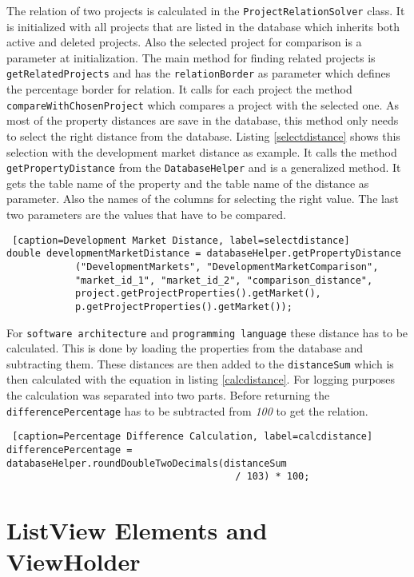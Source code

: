 The relation of two projects is calculated in the \texttt{ProjectRelationSolver} class. It is initialized with all projects that are listed in the database which inherits both active and deleted projects. Also the selected project for comparison is a parameter at initialization. The main method for finding related projects is \texttt{getRelatedProjects} and has the \texttt{relationBorder} as parameter which defines the percentage border for relation. It calls for each project the method \texttt{compareWithChosenProject} which compares a project with the selected one. As most of the property distances are save in the database, this method only needs to select the right distance from the database. Listing \ref{selectdistance} shows this selection with the development market distance as example. It calls the method \texttt{getPropertyDistance} from the \texttt{DatabaseHelper} and is a generalized method. It gets the table name of the property and the table name of the distance as parameter. Also the names of the columns for selecting the right value. The last two parameters are the values that have to be compared.
\begin{lstlisting} [caption=Development Market Distance, label=selectdistance] 
double developmentMarketDistance = databaseHelper.getPropertyDistance
			("DevelopmentMarkets", "DevelopmentMarketComparison", 
			"market_id_1", "market_id_2", "comparison_distance",
			project.getProjectProperties().getMarket(),
		    p.getProjectProperties().getMarket());

\end{lstlisting}
For \texttt{software architecture} and \texttt{programming language} these distance has to be calculated. This is done by loading the properties from the database and subtracting them. These distances are then added to the \texttt{distanceSum} which is then calculated with the equation in listing \ref{calcdistance}. For logging purposes the calculation was separated into two parts. Before returning the \texttt{differencePercentage} has to be subtracted from \textit{100} to get the relation.
\begin{lstlisting} [caption=Percentage Difference Calculation, label=calcdistance] 
differencePercentage = databaseHelper.roundDoubleTwoDecimals(distanceSum 
										/ 103) * 100;
\end{lstlisting}
\section{ListView Elements and ViewHolder}

